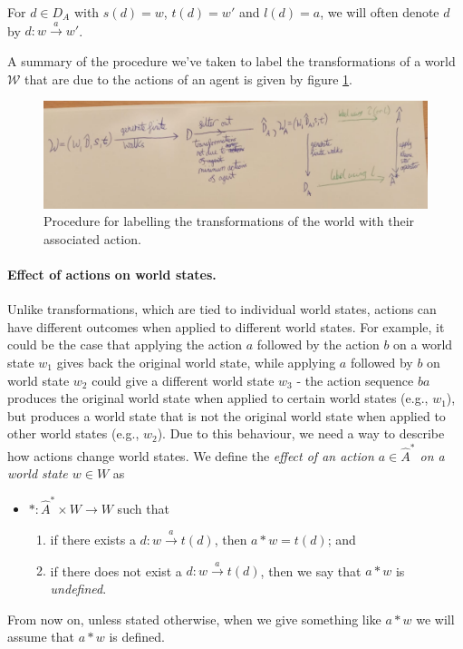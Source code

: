 For $d \in D_{A}$ with $s(d) = w$, $t(d) = w'$ and $l(d) = a$, we will often denote $d$ by $d: w \xrightarrow{a} w'$.

A summary of the procedure we've taken to label the transformations of a world $\mathscr{W}$ that are due to the actions of an agent is given by figure \ref{fig:action_labelling_procedure}.

\begin{figure}
    \centering
    \includegraphics[width=\linewidth]{2MathematicalFramework/InitialFramework/Images/action_labelling_procedure.jpeg}
    \caption{Procedure for labelling the transformations of the world with their associated action.}
    \label{fig:action_labelling_procedure}
\end{figure}


\paragraph{Effect of actions on world states.}
Unlike transformations, which are tied to individual world states, actions can have different outcomes when applied to different world states.
For example, it could be the case that applying the action $a$ followed by the action $b$ on a world state $w_{1}$ gives back the original world state, while applying $a$ followed by $b$ on world state $w_{2}$ could give a different world state $w_{3}$ - the action sequence $ba$ produces the original world state when applied to certain world states (e.g., $w_{1}$), but produces a world state that is not the original world state when applied to other world states (e.g., $w_{2}$).
Due to this behaviour, we need a way to describe how actions change world states.
We define the \emph{effect of an action $a \in \hat{A}^{\ast}$ on a world state $w \in W$} as

\begin{itemize}
    \item[] $\ast: \hat{A}^{\ast} \times W \to W$ such that
    \begin{enumerate}[(1)]
        \item if there exists a $d: w \xrightarrow{a} t(d)$, then $a \ast w = t(d)$; and
        \item if there does not exist a $d: w \xrightarrow{a} t(d)$, then we say that $a \ast w$ is \emph{undefined}.
    \end{enumerate}
\end{itemize}
From now on, unless stated otherwise, when we give something like $a \ast w$ we will assume that $a \ast w$ is defined.

